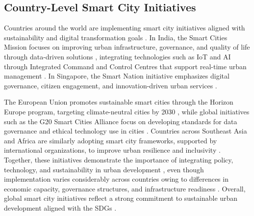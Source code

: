 \documentclass[journal]{IEEEtran}
\begin{document}
\subsection{Country-Level Smart City Initiatives}
Countries around the world are implementing smart city initiatives aligned with sustainability and digital transformation goals \cite{r1,r120}. In India, the Smart Cities Mission focuses on improving urban infrastructure, governance, and quality of life through data-driven solutions \cite{r2,r121}, integrating technologies such as IoT and AI through Integrated Command and Control Centres that support real-time urban management \cite{r3,r122}. In Singapore, the Smart Nation initiative emphasizes digital governance, citizen engagement, and innovation-driven urban services \cite{r4,r123}.

The European Union promotes sustainable smart cities through the Horizon Europe program, targeting climate-neutral cities by 2030 \cite{r1,r120}, while global initiatives such as the G20 Smart Cities Alliance focus on developing standards for data governance and ethical technology use in cities \cite{r94}. Countries across Southeast Asia and Africa are similarly adopting smart city frameworks, supported by international organizations, to improve urban resilience and inclusivity \cite{r4,r123}. Together, these initiatives demonstrate the importance of integrating policy, technology, and sustainability in urban development \cite{r1,r120,r4,r123}, even though implementation varies considerably across countries owing to differences in economic capacity, governance structures, and infrastructure readiness \cite{r4,r123}. Overall, global smart city initiatives reflect a strong commitment to sustainable urban development aligned with the SDGs \cite{r1,r114,r120}.
\end{document}
